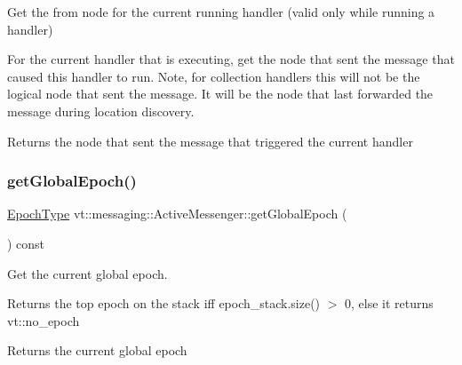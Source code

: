 Get the from node for the current running handler (valid only while running a handler) 

For the current handler that is executing, get the node that sent the message that caused this handler to run. Note, for collection handlers this will not be the logical node that sent the message. It will be the node that last forwarded the message during location discovery.

\begin{DoxyReturn}{Returns}
the node that sent the message that triggered the current handler 
\end{DoxyReturn}
\mbox{\label{structvt_1_1messaging_1_1_active_messenger_abb892a84a906954d8769794ccfb0c638}} 
\subsubsection{\texorpdfstring{get\+Global\+Epoch()}{getGlobalEpoch()}}
{\footnotesize\ttfamily \hyperlink{namespacevt_a985a5adf291c34a3ca263b3378388236}{Epoch\+Type} vt\+::messaging\+::\+Active\+Messenger\+::get\+Global\+Epoch (\begin{DoxyParamCaption}{ }\end{DoxyParamCaption}) const\hspace{0.3cm}{\ttfamily [inline]}}



Get the current global epoch. 

{\ttfamily Returns} the top epoch on the stack iff {\ttfamily epoch\+\_\+stack.\+size()} $>$ 0, else it returns {\ttfamily vt\+::no\+\_\+epoch} 

\begin{DoxyReturn}{Returns}
the current global epoch 
\end{DoxyReturn}
\mbox{\label{structvt_1_1messaging_1_1_active_messenger_a3ec09d3c055bee21bfd3d55a9c500b39}} 

